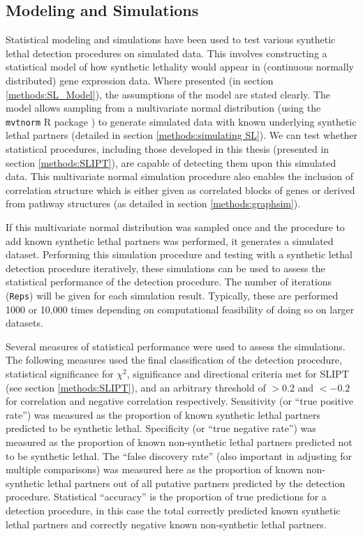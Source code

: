 \subsection{Modeling and Simulations} \label{methods:simulation}
Statistical modeling and simulations have been used to test various synthetic lethal detection procedures on simulated data. This involves constructing a statistical model of how synthetic lethality would appear in (continuous normally distributed) gene expression data. Where presented (in section \ref{methods:SL_Model}), the assumptions of the model are stated clearly. The model allows sampling from a multivariate normal distribution (using the \texttt{mvtnorm} R package \citep{Genz2009, mvtnorm}) to generate simulated data with known underlying synthetic lethal partners (detailed in section \ref{methods:simulating SL}). We can test whether statistical procedures, including those developed in this thesis (presented in section \ref{methods:SLIPT}), are capable of detecting them upon this simulated data. This multivariate normal simulation procedure also enables the inclusion of correlation structure which is either given as correlated blocks of genes or derived from pathway structures (as detailed in section \ref{methods:graphsim}).

If this multivariate normal distribution was sampled once and the procedure to add known synthetic lethal partners was performed, it generates a simulated dataset. Performing this simulation procedure and testing with a synthetic lethal detection procedure iteratively, these simulations can be used to assess the statistical performance of the detection procedure. The number of iterations (\texttt{Reps}) will be given for each simulation result. Typically, these are performed 1000 or 10,000 times depending on computational feasibility of doing so on larger datasets. 

Several measures of statistical performance were used to assess the simulations. The following measures used the final classification of the detection procedure, statistical significance for $\chi^2$, significance and directional criteria met for SLIPT (see section \ref{methods:SLIPT}), and an arbitrary threshold of $>0.2$ and $<-0.2$ for correlation and negative correlation respectively. Sensitivity (or ``true positive rate'') was measured as the proportion of known synthetic lethal partners predicted to be synthetic lethal. Specificity (or ``true negative rate'') was measured as the proportion of known non-synthetic lethal partners predicted not to be synthetic lethal. The ``false discovery rate'' (also important in adjusting for multiple comparisons) was measured here as the proportion of known non-synthetic lethal partners out of all putative partners predicted by the detection procedure. Statistical ``accuracy'' is the proportion of true predictions for a detection procedure, in this case the total correctly predicted known synthetic lethal partners and correctly negative known non-synthetic lethal partners.

